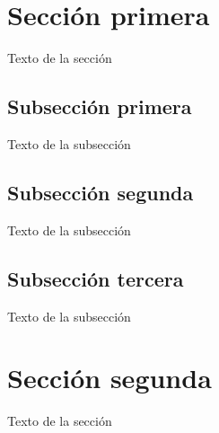 \documentclass[a4paper, 10pt]{article}
\begin{document}
\tableofcontents

\section{Sección primera}

Texto de la sección

\subsection{Subsección primera}

Texto de la subsección


\subsection*{Subsección segunda}

Texto de la subsección 

\subsection{Subsección tercera}

Texto de la subsección

\section{Sección segunda}

Texto de la sección
\end{document}
